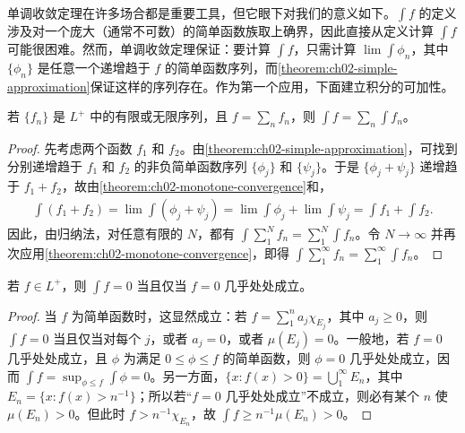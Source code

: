 \documentclass[../../main.tex]{subfiles}%
\begin{document}
单调收敛定理在许多场合都是重要工具，但它眼下对我们的意义如下。$\int f$ 的定义涉及对一个庞大（通常不可数）的简单函数族取上确界，因此直接从定义计算 $\int f$ 可能很困难。然而，单调收敛定理保证：要计算 $\int f$，只需计算 $\lim\int\phi_n$，其中 $\{\phi_n\}$ 是任意一个递增趋于 $f$ 的简单函数序列，而\cref{theorem:ch02-simple-approximation}保证这样的序列存在。作为第一个应用，下面建立积分的可加性。
\begin{theorem}\label{theorem:ch02-integral-series}
若 $\{f_n\}$ 是 $L^+$ 中的有限或无限序列，且 $f=\sum_n f_n$，则 $\int f=\sum_n\int f_n$。
\end{theorem}
\begin{proof}
先考虑两个函数 $f_1$ 和 $f_2$。由\cref{theorem:ch02-simple-approximation}，可找到分别递增趋于 $f_1$ 和 $f_2$ 的非负简单函数序列 $\{\phi_j\}$ 和 $\{\psi_j\}$。于是 $\{\phi_j+\psi_j\}$ 递增趋于 $f_1+f_2$，故由\cref{theorem:ch02-monotone-convergence}和，
\begin{align*}
\int(f_1+f_2)=\lim\int(\phi_j+\psi_j)=\lim\int\phi_j+\lim\int\psi_j=\int f_1+\int f_2.
\end{align*}
因此，由归纳法，对任意有限的 $N$，都有 $\int\sum_1^N f_n=\sum_1^N\int f_n$。令 $N\to\infty$ 并再次应用\cref{theorem:ch02-monotone-convergence}，即得 $\int\sum_1^\infty f_n=\sum_1^\infty\int f_n$。
\end{proof}
\begin{proposition}\label{proposition:ch02-zero-integral}
若 $f\in L^+$，则 $\int f=0$ 当且仅当 $f=0$ 几乎处处成立。
\end{proposition}
\begin{proof}
当 $f$ 为简单函数时，这显然成立：若 $f=\sum_1^n a_j\chi_{E_j}$，其中 $a_j\ge0$，则 $\int f=0$ 当且仅当对每个 $j$，或者 $a_j=0$，或者 $\mu(E_j)=0$。一般地，若 $f=0$ 几乎处处成立，且 $\phi$ 为满足 $0\le\phi\le f$ 的简单函数，则 $\phi=0$ 几乎处处成立，因而 $\int f=\sup_{\phi\le f}\int\phi=0$。另一方面，$\{x:f(x)>0\}=\bigcup_1^\infty E_n$，其中 $E_n=\{x:f(x)>n^{-1}\}$；所以若“$f=0$ 几乎处处成立”不成立，则必有某个 $n$ 使 $\mu(E_n)>0$。但此时 $f>n^{-1}\chi_{E_n}$，故 $\int f\ge n^{-1}\mu(E_n)>0$。
\end{proof}
\end{document}
